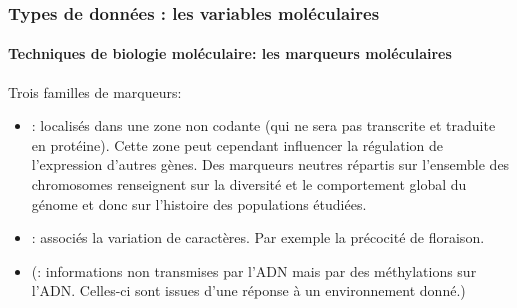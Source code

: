 \begin{frame}
\frametitle{Types de données : les variables moléculaires}
\framesubtitle{Techniques de biologie moléculaire: les marqueurs moléculaires}

Trois familles de marqueurs:

\begin{itemize}[<+->]
\item {}: localisés dans  une zone non codante (qui ne sera pas  transcrite et traduite en protéine).  Cette zone peut cependant influencer la  régulation de l’expression d’autres gènes.
Des marqueurs neutres répartis sur l’ensemble des chromosomes renseignent sur la diversité et le comportement global du génome et donc sur l’histoire des populations étudiées. 

\item {}: associés la variation de caractères.
Par exemple la précocité de floraison.

\item (: informations non transmises par l'ADN mais par des méthylations sur l'ADN. Celles-ci sont issues d'une réponse à un environnement donné.)

\end{itemize} 


\end{frame}


